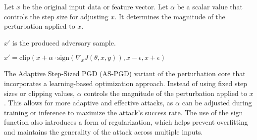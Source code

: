 Let $x$ be the original input data or feature vector. Let $\alpha$ be a scalar value that controls the step size for adjusting $x$. It determines the magnitude of the perturbation applied to $x$.

$x'$ is the produced adversary sample.

$x' = \text{clip}(x + \alpha \cdot \text{sign}(\nabla_x J(\theta, x, y)), x - \epsilon, x + \epsilon)$

The Adaptive Step-Sized PGD (AS-PGD) variant of the perturbation core that incorporates a learning-based optimization approach. Instead of using fixed step sizes or clipping values, $\alpha$ controls the magnitude of the perturbation applied to $x$. This allows for more adaptive and effective attacks, as $\alpha$ can be adjusted during training or inference to maximize the attack's success rate. The use of the sign function also introduces a form of regularization, which helps prevent overfitting and maintains the generality of the attack across multiple inputs.